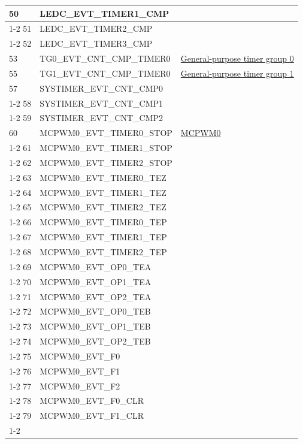 \documentclass[main\_\_EN.tex]{subfiles}
\begin{document}
\begin{longtable}{ | l | l | l | }
50  & LEDC\_EVT\_TIMER1\_CMP    & \\ \cline{1-2}
51  & LEDC\_EVT\_TIMER2\_CMP    & \\ \cline{1-2}
52  & LEDC\_EVT\_TIMER3\_CMP    & \\ \hline
53  & TG0\_EVT\_CNT\_CMP\_TIMER0    & \hyperref[mod:timg]{General-purpose timer group 0}   \\ \hline
55  & TG1\_EVT\_CNT\_CMP\_TIMER0    & \hyperref[mod:timg]{General-purpose timer group 1}   \\ \hline
57  & SYSTIMER\_EVT\_CNT\_CMP0  & \nameref{mod:systimer}     \\ \cline{1-2}
58  & SYSTIMER\_EVT\_CNT\_CMP1  & \\ \cline{1-2}
59  & SYSTIMER\_EVT\_CNT\_CMP2  & \\ \hline
60  & MCPWM0\_EVT\_TIMER0\_STOP  & \hyperref[mod:mcpwm]{MCPWM0}\\ \cline{1-2}
61  & MCPWM0\_EVT\_TIMER1\_STOP  & \\ \cline{1-2}
62  & MCPWM0\_EVT\_TIMER2\_STOP  & \\ \cline{1-2}
63  & MCPWM0\_EVT\_TIMER0\_TEZ   & \\ \cline{1-2}
64  & MCPWM0\_EVT\_TIMER1\_TEZ   & \\ \cline{1-2}
65  & MCPWM0\_EVT\_TIMER2\_TEZ   & \\ \cline{1-2}
66  & MCPWM0\_EVT\_TIMER0\_TEP   & \\ \cline{1-2}
67  & MCPWM0\_EVT\_TIMER1\_TEP   & \\ \cline{1-2}
68  & MCPWM0\_EVT\_TIMER2\_TEP   & \\ \cline{1-2}
69  & MCPWM0\_EVT\_OP0\_TEA & \\ \cline{1-2}
70  & MCPWM0\_EVT\_OP1\_TEA & \\ \cline{1-2}
71  & MCPWM0\_EVT\_OP2\_TEA & \\ \cline{1-2}
72  & MCPWM0\_EVT\_OP0\_TEB & \\ \cline{1-2}
73  & MCPWM0\_EVT\_OP1\_TEB & \\ \cline{1-2}
74  & MCPWM0\_EVT\_OP2\_TEB & \\ \cline{1-2}
75  & MCPWM0\_EVT\_F0     & \\ \cline{1-2}
76  & MCPWM0\_EVT\_F1     & \\ \cline{1-2}
77  & MCPWM0\_EVT\_F2     & \\ \cline{1-2}
78  & MCPWM0\_EVT\_F0\_CLR  & \\ \cline{1-2}
79  & MCPWM0\_EVT\_F1\_CLR  & \\ \cline{1-2}

\end{longtable}
\end{document}
